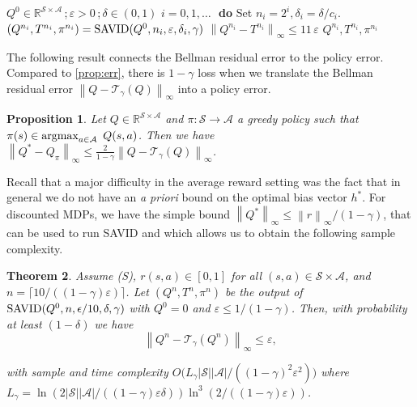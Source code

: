 \documentclass{article}
\newcommand{\Argmax}{\mathop{\rm argmax}}
\newcommand{\cA}{\mathcal{A}}
\newcommand{\cS}{\mathcal{S}}
\newcommand{\T}{\mathcal{T}}
\newcommand{\real}{\mathbb{R}}
\newcommand{\reals}{\mathbb{R}}
\newcommand*{\infn}[1]{\left\|{#1}\right\|_{\infty}}
\newcommand{\R}{r}
\theoremstyle{plain}
\newtheorem{theorem}{Theorem}[section]
\newtheorem{proposition}[theorem]{Proposition}
\theoremstyle{definition}
\theoremstyle{remark}
\begin{document}
\begin{algorithm}[ht!]
  \caption{\mbox{\sc \mbox{\rm SAVID\textbf{+}}}$(Q^0,\varepsilon,\delta, \gamma)$}
  \label{alg:example_sample-d}
\begin{algorithmic}
   $Q^{0}\!\in\real^{\cS\times\cA}$\,;\,$\varepsilon>0$\,;\,$\delta\in(0,1)$
   $i=0,1,\dots$ \,\,\textbf{do} 
    \STATE \quad Set $n_i= 2^i,  \delta_i = \delta/c_i $. 
    \STATE \quad  $(Q^{n_i},T^{n_i}, \pi^{n_i} ) = \mbox{\sc \mbox{\rm SAVID}}(Q^0,n_i,\varepsilon,\delta_i, \gamma)$
      $\infn{Q^{n_i}-T^{n_i}}\leq 11\,\varepsilon$
 $Q^{n_i},T^{n_i}, \pi^{n_i}$
\end{algorithmic}
\end{algorithm}
The following result connects the Bellman residual error to the policy error. Compared to \cref{prop:err}, there is  $1-\gamma$ loss  when we translate the Bellman residual error $\infn{Q-\T_\gamma(Q)}$ into a policy error.
\begin{proposition} \label{prop:err-d}
    Let $Q\in\reals^{\cS\times\cA}$ and $\pi:\cS\to\cA$ a greedy policy such that $\pi(s)\in\Argmax_{a\in\cA}~Q(s,a)$. Then we have $ \infn{Q^*-Q_{\pi}}\leq \frac{2}{1-\gamma}\infn{Q-\T_\gamma(Q)}$.
\end{proposition}
Recall that a major difficulty in the average reward setting was the fact that in general we do not have an {\em a priori} bound on the optimal bias vector $h^*$\!. For discounted MDPs, we have the simple bound $\infn{Q^*} \le \infn{\R}/(1\!-\!\gamma)$, that can be used to run \mbox{\rm SAVID} and 
which allows us to obtain the following sample complexity.
\begin{theorem}\label{cor:err-d}
   Assume \mbox{\sc (S)}, $ r(s,a) \in [0,1]$ for all $(s,a)\in\cS\times \cA$, and $n\!=\!\lceil{10/((1\!-\!\gamma)\varepsilon)}\rceil$. Let $(Q^n,T^n,\pi^n)$ be the output of $ \mbox{\rm SAVID}(Q^0,n, \epsilon/10, \delta, \gamma)$ with $Q^0=0$ and $\varepsilon \le 1/(1\!-\!\gamma)$. Then, with probability at least $(1-\delta)$ we have
\vspace{-1ex}
  $$ \infn{Q^n-\T_\gamma(Q^n)}\leq \varepsilon,$$
 
  \vspace{-2ex}
   with sample and time complexity ${O}\big(L_{\gamma}|\cS||\cA|/((1\!-\!\gamma)^2\varepsilon^{2})\big)$
   where $L_{\gamma}=\ln (2|\cS||\cA|/((1\!-\!\gamma)\varepsilon \delta))\ln^3 (2/((1\!-\!\gamma)\varepsilon)) $.
\end{theorem} 
\end{document}
